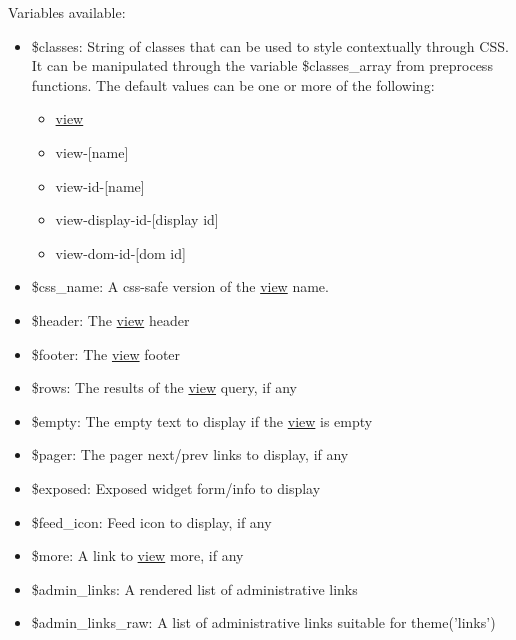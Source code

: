 Variables available:\begin{itemize}
\item \$classes: String of classes that can be used to style contextually through CSS. It can be manipulated through the variable \$classes\_\-array from preprocess functions. The default values can be one or more of the following:\begin{itemize}
\item \hyperlink{classview}{view}\item view-\mbox{[}name\mbox{]}\item view-id-\mbox{[}name\mbox{]}\item view-display-id-\mbox{[}display id\mbox{]}\item view-dom-id-\mbox{[}dom id\mbox{]}\end{itemize}
\item \$css\_\-name: A css-safe version of the \hyperlink{classview}{view} name.\item \$header: The \hyperlink{classview}{view} header\item \$footer: The \hyperlink{classview}{view} footer\item \$rows: The results of the \hyperlink{classview}{view} query, if any\item \$empty: The empty text to display if the \hyperlink{classview}{view} is empty\item \$pager: The pager next/prev links to display, if any\item \$exposed: Exposed widget form/info to display\item \$feed\_\-icon: Feed icon to display, if any\item \$more: A link to \hyperlink{classview}{view} more, if any\item \$admin\_\-links: A rendered list of administrative links\item \$admin\_\-links\_\-raw: A list of administrative links suitable for theme('links') \end{itemize}
